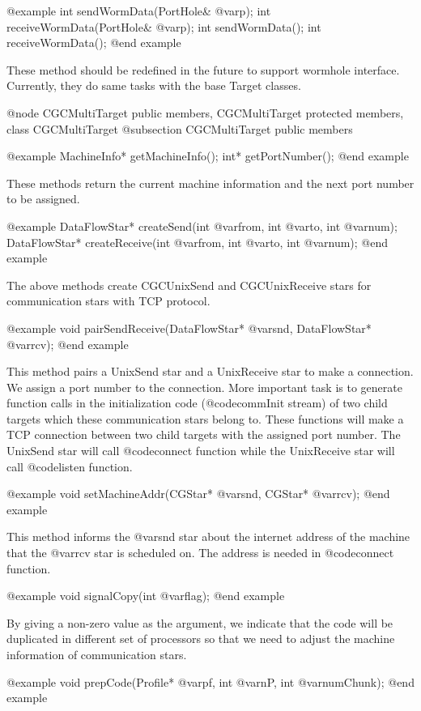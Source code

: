 {@example
int sendWormData(PortHole& @var{p});
int receiveWormData(PortHole& @var{p});
int sendWormData();
int receiveWormData();
@end example

These method should be redefined in the future to support
wormhole interface. Currently, they do same tasks with the base Target
classes.

@node CGCMultiTarget public members, CGCMultiTarget protected members, class CGCMultiTarget
@subsection CGCMultiTarget public members

@example
MachineInfo* getMachineInfo();
int* getPortNumber();
@end example

These methods return the current machine information and the next port number
to be assigned.

@example
DataFlowStar* createSend(int @var{from}, int @var{to}, int @var{num});
DataFlowStar* createReceive(int @var{from}, int @var{to}, int @var{num});
@end example

The above methods create CGCUnixSend and CGCUnixReceive stars for
communication stars with TCP protocol.

@example
void pairSendReceive(DataFlowStar* @var{snd}, DataFlowStar* @var{rcv});
@end example

This method pairs a UnixSend star and a UnixReceive star to make a
connection. We assign a port number to the connection. More important
task is to generate function calls in the initialization code (@code{commInit}
stream) of two child targets which these communication stars belong to.
These functions will make a TCP connection between two child targets with
the assigned port number. The UnixSend star will call @code{connect}
function while the UnixReceive star will call @code{listen} function.

@example
void setMachineAddr(CGStar* @var{snd}, CGStar* @var{rcv});
@end example

This method informs the @var{snd} star about the internet address of 
the machine that the @var{rcv} star is scheduled on. The address is needed in
@code{connect} function. 

@example
void signalCopy(int @var{flag});
@end example

By giving a non-zero value as the argument, we indicate that the code
will be duplicated in different set of processors so that we need to
adjust the machine information of communication stars.

@example
void prepCode(Profile* @var{pf}, int @var{nP}, int @var{numChunk});
@end example

}

